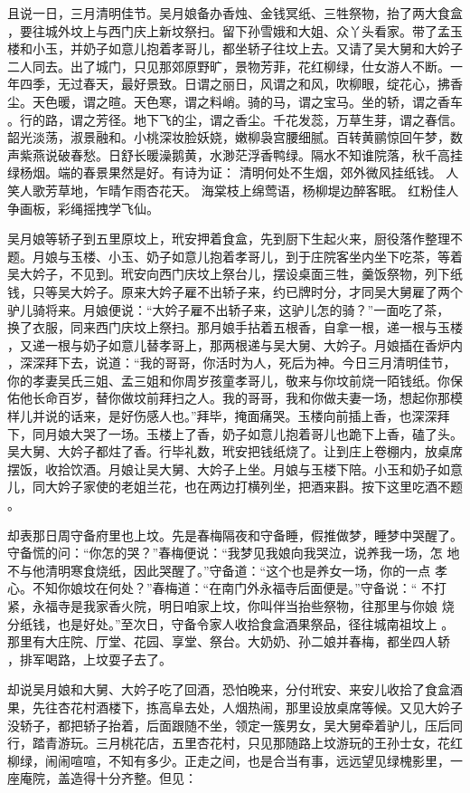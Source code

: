 且说一日，三月清明佳节。吴月娘备办香烛、金钱冥纸、三牲祭物，抬了两大食盒
，要往城外坟上与西门庆上新坟祭扫。留下孙雪娥和大姐、众丫头看家。带了孟玉
楼和小玉，并奶子如意儿抱着孝哥儿，都坐轿子往坟上去。又请了吴大舅和大妗子
二人同去。出了城门，只见那郊原野旷，景物芳菲，花红柳绿，仕女游人不断。一
年四季，无过春天，最好景致。日谓之丽日，风谓之和风，吹柳眼，绽花心，拂香
尘。天色暖，谓之暄。天色寒，谓之料峭。骑的马，谓之宝马。坐的轿，谓之香车
。行的路，谓之芳径。地下飞的尘，谓之香尘。千花发蕊，万草生芽，谓之春信。
韶光淡荡，淑景融和。小桃深妆脸妖娆，嫩柳袅宫腰细腻。百转黄鹂惊回午梦，数
声紫燕说破春愁。日舒长暖澡鹅黄，水渺茫浮香鸭绿。隔水不知谁院落，秋千高挂
绿杨烟。端的春景果然是好。有诗为证：
清明何处不生烟，郊外微风挂纸钱。
人笑人歌芳草地，乍晴乍雨杏花天。
海棠枝上绵莺语，杨柳堤边醉客眠。
红粉佳人争画板，彩绳摇拽学飞仙。

吴月娘等轿子到五里原坟上，玳安押着食盒，先到厨下生起火来，厨役落作整理不
题。月娘与玉楼、小玉、奶子如意儿抱着孝哥儿，到于庄院客坐内坐下吃茶，等着
吴大妗子，不见到。玳安向西门庆坟上祭台儿，摆设桌面三牲，羹饭祭物，列下纸
钱，只等吴大妗子。原来大妗子雇不出轿子来，约已牌时分，才同吴大舅雇了两个
驴儿骑将来。月娘便说：“大妗子雇不出轿子来，这驴儿怎的骑？”一面吃了茶，
换了衣服，同来西门庆坟上祭扫。那月娘手拈着五根香，自拿一根，递一根与玉楼
，又递一根与奶子如意儿替孝哥上，那两根递与吴大舅、大妗子。月娘插在香炉内
，深深拜下去，说道：“我的哥哥，你活时为人，死后为神。今日三月清明佳节，
你的孝妻吴氏三姐、孟三姐和你周岁孩童孝哥儿，敬来与你坟前烧一陌钱纸。你保
佑他长命百岁，替你做坟前拜扫之人。我的哥哥，我和你做夫妻一场，想起你那模
样儿并说的话来，是好伤感人也。”拜毕，掩面痛哭。玉楼向前插上香，也深深拜
下，同月娘大哭了一场。玉楼上了香，奶子如意儿抱着哥儿也跪下上香，磕了头。
吴大舅、大妗子都炷了香。行毕礼数，玳安把钱纸烧了。让到庄上卷棚内，放桌席
摆饭，收拾饮酒。月娘让吴大舅、大妗子上坐。月娘与玉楼下陪。小玉和奶子如意
儿，同大妗子家使的老姐兰花，也在两边打横列坐，把酒来斟。按下这里吃酒不题
。

却表那日周守备府里也上坟。先是春梅隔夜和守备睡，假推做梦，睡梦中哭醒了。
守备慌的问：“你怎的哭？”春梅便说：“我梦见我娘向我哭泣，说养我一场，怎
地不与他清明寒食烧纸，因此哭醒了。”守备道：“这个也是养女一场，你的一点
孝心。不知你娘坟在何处？”春梅道：“在南门外永福寺后面便是。”守备说：“
不打紧，永福寺是我家香火院，明日咱家上坟，你叫伴当抬些祭物，往那里与你娘
烧分纸钱，也是好处。”至次日，守备令家人收拾食盒酒果祭品，径往城南祖坟上
。那里有大庄院、厅堂、花园、享堂、祭台。大奶奶、孙二娘并春梅，都坐四人轿
，排军喝路，上坟耍子去了。

却说吴月娘和大舅、大妗子吃了回酒，恐怕晚来，分付玳安、来安儿收拾了食盒酒
果，先往杏花村酒楼下，拣高阜去处，人烟热闹，那里设放桌席等候。又见大妗子
没轿子，都把轿子抬着，后面跟随不坐，领定一簇男女，吴大舅牵着驴儿，压后同
行，踏青游玩。三月桃花店，五里杏花村，只见那随路上坟游玩的王孙士女，花红
柳绿，闹闹喧喧，不知有多少。正走之间，也是合当有事，远远望见绿槐影里，一
座庵院，盖造得十分齐整。但见：

